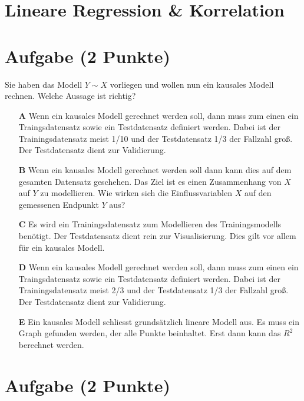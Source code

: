\documentclass[a4paper, 9pt]{scrartcl}\usepackage[]{graphicx}\usepackage[]{xcolor}
\begin{document}
\section*{Lineare Regression \& Korrelation}

\section{Aufgabe \hfill (2 Punkte)}



Sie haben das Modell $Y \sim X$ vorliegen und wollen nun ein kausales Modell rechnen. Welche Aussage ist richtig?



\begin{enumerate}
\item [\textbf{A} \msquare] Wenn ein kausales Modell gerechnet werden soll, dann muss zum einen ein Traingsdatensatz sowie ein Testdatensatz definiert werden. Dabei ist der Trainingsdatensatz meist 1/10 und der Testdatensatz 1/3 der Fallzahl groß. Der Testdatensatz dient zur Validierung.
\item [\textbf{B} \msquare] Wenn ein kausales Modell gerechnet werden soll dann kann dies auf dem gesamten Datensatz geschehen. Das Ziel ist es einen Zusammenhang von $X$ auf $Y$ zu modellieren. Wie wirken sich die Einflussvariablen $X$ auf den gemessenen Endpunkt $Y$ aus?
\item [\textbf{C} \msquare] Es wird ein Trainingsdatensatz zum Modellieren des Trainingsmodells benötigt. Der Testdatensatz dient rein zur Visualisierung. Dies gilt vor allem für ein kausales Modell.
\item [\textbf{D} \msquare] Wenn ein kausales Modell gerechnet werden soll, dann muss zum einen ein Traingsdatensatz sowie ein Testdatensatz definiert werden. Dabei ist der Trainingsdatensatz meist 2/3 und der Testdatensatz 1/3 der Fallzahl groß. Der Testdatensatz dient zur Validierung.
\item [\textbf{E} \msquare] Ein kausales Modell schliesst grundsätzlich lineare Modell aus. Es muss ein Graph gefunden werden, der alle Punkte beinhaltet. Erst dann kann das $R^2$ berechnet werden.
\end{enumerate}

\section{Aufgabe \hfill (2 Punkte)}
\end{document}

